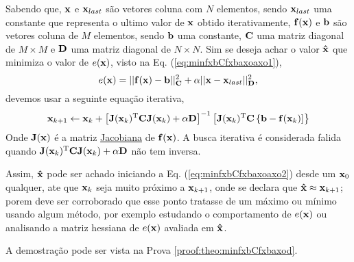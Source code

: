 \begin{theorem}\label{theo:minfxbCfxbaxoaxo}
Sabendo que, $\VECTOR{x}$ e $\VECTOR{x}_{last}$ são vetores coluna com $N$ elementos, 
sendo $\VECTOR{x}_{last}$ uma constante que representa o ultimo valor de $\VECTOR{x}$ obtido iterativamente, $\VECTOR{f}(\VECTOR{x})$ e 
$\VECTOR{b}$ são vetores coluna de $M$ elementos, sendo $\VECTOR{b}$ uma constante,
$\MATRIX{C}$ uma matriz diagonal de $M \times M$ e 
$\MATRIX{D}$ uma matriz diagonal de $N \times N$.
Sim se deseja achar o valor $\VECTOR{\hat{x}}$ que minimiza o valor de $e(\VECTOR{x})$, visto na Eq. (\ref{eq:minfxbCfxbaxoaxo1}),
\begin{equation}\label{eq:minfxbCfxbaxoaxo1}
e(\VECTOR{x})=||\VECTOR{f}(\VECTOR{x})-\VECTOR{b}||_{\MATRIX{C}}^2+\alpha||\VECTOR{x}-\VECTOR{x}_{last}||_{\MATRIX{D}}^2,
\end{equation}
devemos usar a seguinte equação iterativa,
\begin{equation}\label{eq:minfxbCfxbaxoaxo2}
\VECTOR{x}_{k+1}\leftarrow \VECTOR{x}_k+
\left[ \MATRIX{J}(\VECTOR{x}_k)^{\transpose}\MATRIX{C} \MATRIX{J}(\VECTOR{x}_k) +\alpha\MATRIX{D} \right]^{-1}
 \left[\MATRIX{J}(\VECTOR{x}_k)^{\transpose}\MATRIX{C}\left\{\VECTOR{b}-\VECTOR{f}(\VECTOR{x}_k)\right] \right\}
\end{equation}
Onde  $\MATRIX{J}(\VECTOR{x})$ é a matriz \hyperref[def:jacobian]{Jacobiana} \cite{Jacobian} de $\VECTOR{f}(\VECTOR{x})$.
A busca iterativa é considerada falida quando 
$\MATRIX{J}(\VECTOR{x}_k)^{\transpose}\MATRIX{C} \MATRIX{J}(\VECTOR{x}_k) +\alpha\MATRIX{D}$
não tem inversa.

Assim, $\VECTOR{\hat{x}}$ pode ser achado iniciando a Eq. (\ref{eq:minfxbCfxbaxoaxo2}) desde um $\VECTOR{x}_{0}$ qualquer, ate que $\VECTOR{x}_{k}$ seja muito próximo a $\VECTOR{x}_{k+1}$,
onde se declara que $\VECTOR{\hat{x}} \approx \VECTOR{x}_{k+1}$; porem deve ser corroborado
que esse ponto tratasse de um máximo ou mínimo usando algum método, por exemplo estudando o comportamento 
de $e(\VECTOR{x})$ ou analisando a matriz hessiana de $e(\VECTOR{x})$ avaliada em $\VECTOR{\hat{x}}$.

A demostração pode ser vista na Prova \ref{proof:theo:minfxbCfxbaxod}.
\end{theorem} 



